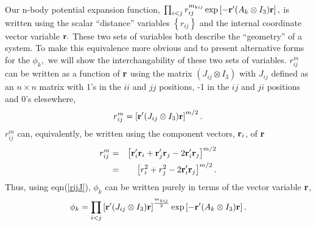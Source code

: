Our n-body potential expansion function, $\prod_{i<j}r_{ij}^{m_{kij}}\exp
\left[ -{\bf r}^{\prime }(A_k\otimes I_3){\bf r}\right] ,$ is written using
the scalar ``distance'' variables $\left\{ r_{ij}\right\} $ and the internal
coordinate vector variable ${\bf r.}$ These two sets of variables both
describe the ``geometry'' of a system. To make this equivalence more obvious
and to present alternative forms for the $\phi _k,$ we will show the
interchangability of these two sets of variables. $r_{ij}^m$ can be written
as a function of ${\bf r}$ using the matrix $\left( J_{ij}\otimes I_3\right) 
$ with $J_{ij}$ defined as an $n\times n$ matrix with 1's in the $ii$ and $jj
$ positions, -1 in the $ij$ and $ji$ positions and 0's elesewhere\cite
{Poshusta83,Kinghorn95a}, 
\begin{equation}
r_{ij}^m=\left[ {\bf r}^{\prime }(J_{ij}\otimes I_3){\bf r}\right] ^{m/2}.
\label{rijJ}
\end{equation}
$r_{ij}^m$ can, equivalently, be written using the component vectors, ${\bf r%
}_i$, of ${\bf r}$ 
\begin{eqnarray}
r_{ij}^m &=&\left[ {\bf r}_i^{\prime }{\bf r}_i+{\bf r}_j^{\prime }{\bf r}%
_j-2{\bf r}_i^{\prime }{\bf r}_j\right] ^{m/2} \\
&=&\left[ r_i^2+r_j^2-2{\bf r}_i^{\prime }{\bf r}_j\right] ^{m/2}.
\end{eqnarray}
Thus, using eqn(\ref{rijJ}), $\phi _k$ can be written purely in terms of the
vector variable ${\bf r}$, 
\begin{equation}
\phi _k=\prod_{i<j}\left[ {\bf r}^{\prime }(J_{ij}\otimes I_3){\bf r}\right]
^{\frac{m_{kij}}2}\exp \left[ -{\bf r}^{\prime }(A_k\otimes I_3){\bf r}%
\right] .  \label{phir}
\end{equation}


